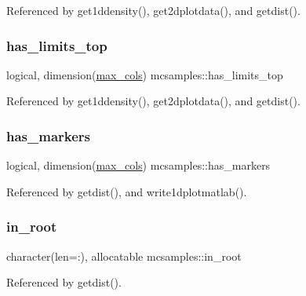 Referenced by get1ddensity(), get2dplotdata(), and getdist().

\mbox{\label{namespacemcsamples_a948a6bc42d1b7b001f55aeaaf2d5b3f8}} 
\subsubsection{\texorpdfstring{has\+\_\+limits\+\_\+top}{has\_limits\_top}}
{\footnotesize\ttfamily logical, dimension(\mbox{\hyperlink{namespacemcsamples_ae8386bad918d8af8d203683c01d5818c}{max\+\_\+cols}}) mcsamples\+::has\+\_\+limits\+\_\+top}



Referenced by get1ddensity(), get2dplotdata(), and getdist().

\mbox{\label{namespacemcsamples_a0233de8ae126379ac2ebc11c0981db61}} 
\subsubsection{\texorpdfstring{has\+\_\+markers}{has\_markers}}
{\footnotesize\ttfamily logical, dimension(\mbox{\hyperlink{namespacemcsamples_ae8386bad918d8af8d203683c01d5818c}{max\+\_\+cols}}) mcsamples\+::has\+\_\+markers}



Referenced by getdist(), and write1dplotmatlab().

\mbox{\label{namespacemcsamples_a0f43faad2c6f83998962006e04268623}} 
\subsubsection{\texorpdfstring{in\+\_\+root}{in\_root}}
{\footnotesize\ttfamily character(len=\+:), allocatable mcsamples\+::in\+\_\+root}



Referenced by getdist().

\mbox{\label{namespacemcsamples_a562ce4b67831be4911c45a4e08a6ef18}} 
